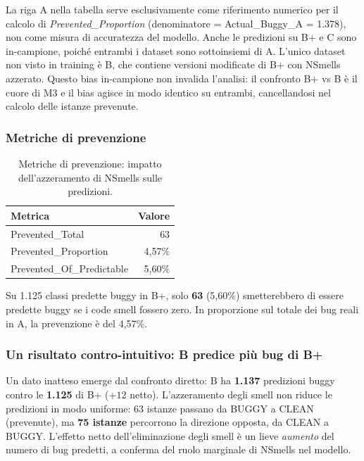 La riga A nella tabella serve esclusivamente come riferimento numerico per il calcolo
di \textit{Prevented\_Proportion} (denominatore = Actual\_Buggy\_A = 1.378), non come
misura di accuratezza del modello. Anche le predizioni su B+ e C sono in-campione,
poiché entrambi i dataset sono sottoinsiemi di A. L'unico dataset non visto in training
è B, che contiene versioni modificate di B+ con NSmells azzerato. Questo bias
in-campione non invalida l'analisi: il confronto B+ vs B è il cuore di M3 e il bias
agisce in modo identico su entrambi, cancellandosi nel calcolo delle istanze prevenute.

\subsubsection{Metriche di prevenzione}

\begin{table}[h]
\centering
\begin{tabular}{lr}
\toprule
\textbf{Metrica} & \textbf{Valore} \\
\midrule
Prevented\_Total           &  63    \\
Prevented\_Proportion      &  4,57\% \\
Prevented\_Of\_Predictable &  5,60\% \\
\bottomrule
\end{tabular}
\caption{Metriche di prevenzione: impatto dell'azzeramento di NSmells sulle predizioni.}
\label{tab:whatif_prevention}
\end{table}

Su 1.125 classi predette buggy in B+, solo \textbf{63} (5,60\%) smetterebbero di essere
predette buggy se i code smell fossero zero. In proporzione sul totale dei bug reali in A,
la prevenzione è del 4,57\%.

\subsubsection{Un risultato contro-intuitivo: B predice più bug di B+}

Un dato inatteso emerge dal confronto diretto: B ha \textbf{1.137} predizioni buggy contro
le \textbf{1.125} di B+ ($+12$ netto). L'azzeramento degli smell non riduce le predizioni
in modo uniforme: 63 istanze passano da BUGGY a CLEAN (prevenute), ma \textbf{75 istanze}
percorrono la direzione opposta, da CLEAN a BUGGY. L'effetto netto dell'eliminazione degli
smell è un lieve \textit{aumento} del numero di bug predetti, a conferma del ruolo marginale
di NSmells nel modello.

